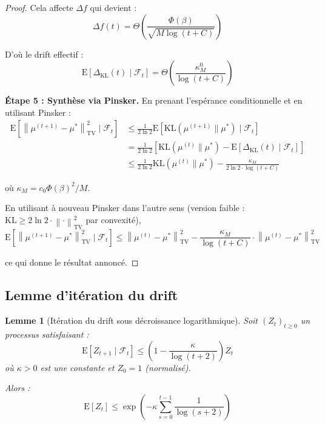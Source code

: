 \documentclass[12pt,a4paper]{article}
\newtheorem{lemma}[theorem]{Lemme}
\theoremstyle{definition}
\theoremstyle{remark}
\newcommand{\E}{\text{E}}
\newcommand{\KL}{\text{KL}}
\newcommand{\TV}{\text{TV}}
\newcommand{\norm}[1]{\left\|#1\right\|}
\begin{document}
\begin{proof}
		Cela affecte $\Delta f$ qui devient :
		\begin{equation}
			\Delta f(t) = \Theta\left(\frac{\Phi(\beta)}{\sqrt{M \log(t+C)}}\right)
		\end{equation}
		
		D'où le drift effectif :
		\begin{equation}
			\E[\Delta_{\KL}(t) \mid \mathcal{F}_t] = \Theta\left(\frac{\kappa_M^0}{\log(t+C)}\right)
		\end{equation}
		
		\textbf{Étape 5 : Synthèse via Pinsker.}
		En prenant l'espérance conditionnelle et en utilisant Pinsker :
		\begin{align}
			\E[\norm{\mu^{(t+1)} - \mu^*}_{\TV}^2 \mid \mathcal{F}_t]
			&\leq \frac{1}{2\ln 2} \E[\KL(\mu^{(t+1)}\|\mu^*) \mid \mathcal{F}_t] \\
			&= \frac{1}{2\ln 2} \left[\KL(\mu^{(t)}\|\mu^*) - \E[\Delta_{\KL}(t) \mid \mathcal{F}_t]\right] \\
			&\leq \frac{1}{2\ln 2} \KL(\mu^{(t)}\|\mu^*) - \frac{\kappa_M}{2\ln 2 \cdot \log(t+C)}
		\end{align}
		
		où $\kappa_M = c_0 \Phi(\beta)^2 / M$.
		
		En utilisant à nouveau Pinsker dans l'autre sens (version faible : $\KL \geq 2\ln 2 \cdot \norm{\cdot}_{\TV}^2$ par convexité),
		\begin{equation}
			\E[\norm{\mu^{(t+1)} - \mu^*}_{\TV}^2 \mid \mathcal{F}_t] \leq \norm{\mu^{(t)} - \mu^*}_{\TV}^2 - \frac{\kappa_M}{\log(t+C)} \cdot \norm{\mu^{(t)} - \mu^*}_{\TV}^2
		\end{equation}
		
		ce qui donne le résultat annoncé.
	\end{proof}
	
	\subsection{Lemme d'itération du drift}
	
	\begin{lemma}[Itération du drift sous décroissance logarithmique]\label{lem:iteration}
		Soit $(Z_t)_{t\geq 0}$ un processus satisfaisant :
		\begin{equation}
			\E[Z_{t+1} \mid \mathcal{F}_t] \leq \left(1 - \frac{\kappa}{\log(t+2)}\right) Z_t
		\end{equation}
		où $\kappa > 0$ est une constante et $Z_0 = 1$ (normalisé).
		
		Alors :
		\begin{equation}
			\E[Z_t] \leq \exp\left(-\kappa \sum_{s=0}^{t-1} \frac{1}{\log(s+2)}\right)
		\end{equation}
	\end{lemma}
	
\end{document}
